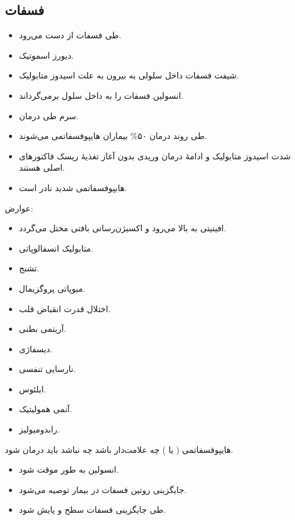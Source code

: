 \documentclass[12pt,a4paper]{article}
\begin{document}
\subsection*{فسفات}
\begin{itemize}
\item طی  فسفات از دست می‌رود.
\item دیورز اسموتیک.
\item شیفت فسفات داخل سلولی به بیرون به علت اسیدوز متابولیک.
\item انسولین فسفات را به داخل سلول برمی‌گرداند.
\item {} سرم طی درمان.
\item طی روند درمان ۵۰\% بیماران هایپوفسفاتمی می‌شوند.
\item شدت اسیدوز متابولیک و ادامهٔ درمان وریدی بدون آغاز تغذیهٔ  ریسک فاکتورهای اصلی هستند.
\item هایپوفسفاتمی شدید نادر است.
\end{itemize}
عوارض:
\begin{itemize}
\item افینیتی  به  بالا می‌رود و اکسیژن‌رسانی بافتی مختل می‌گردد.
\item متابولیک انسفالوپاتی.
\item تشنج.
\item میوپاتی پروگزیمال.
\item اختلال قدرت انقباض قلب.
\item آریتمی بطنی.
\item دیسفاژی.
\item نارسایی تنفسی.
\item ایلئوس.
\item آنمی همولیتیک.
\item رابدومیولیز.
\end{itemize}
هایپوفسفاتمی ( یا ) چه علامت‌دار باشد چه نباشد باید درمان شود.
\begin{itemize}
\item انسولین به طور موقت  شود.
\end{itemize}

\begin{itemize}
\item جایگزینی روتین فسفات در بیمار  توصیه می‌شود.
\item طی جایگزینی فسفات سطح  و  پایش شود.
\end{itemize}
\end{document}
